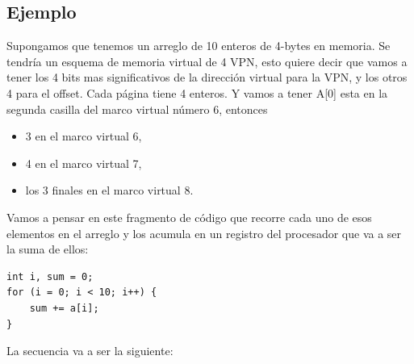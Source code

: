 \documentclass{article}
\begin{document}
\subsection{Ejemplo}
Supongamos que tenemos un arreglo de 10 enteros de 4-bytes en memoria. Se tendría un esquema de memoria virtual de 4 VPN, esto quiere decir que vamos a tener los 4 bits mas significativos de la dirección virtual para la VPN, y los otros 4 para el offset. Cada página tiene 4 enteros. Y vamos a tener A[0] esta en la segunda casilla del marco virtual número 6, entonces
\begin{itemize}
    \item 3 en el marco virtual 6,
    \item 4 en el marco virtual 7,
    \item los 3 finales en el marco virtual 8.
\end{itemize}
Vamos a pensar en este fragmento de código que recorre cada uno de esos elementos en el arreglo y los acumula en un registro del procesador que va a ser la suma de ellos:
\begin{verbatim}
int i, sum = 0;
for (i = 0; i < 10; i++) {
    sum += a[i];
}    
\end{verbatim}
La secuencia va a ser la siguiente:
\end{document}
